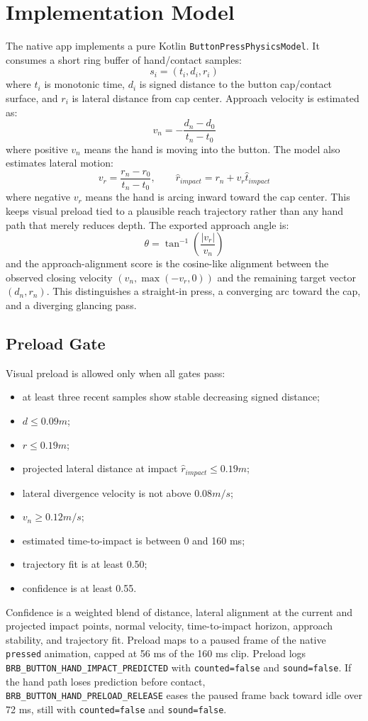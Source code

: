 \documentclass[11pt]{article}
\begin{document}
\section{Implementation Model}
The native app implements a pure Kotlin \texttt{ButtonPressPhysicsModel}. It consumes a short ring buffer of hand/contact samples:
\[
s_i = (t_i, d_i, r_i)
\]
where \(t_i\) is monotonic time, \(d_i\) is signed distance to the button cap/contact surface, and \(r_i\) is lateral distance from cap center. Approach velocity is estimated as:
\[
v_n = -\frac{d_n - d_0}{t_n - t_0}
\]
where positive \(v_n\) means the hand is moving into the button.
The model also estimates lateral motion:
\[
v_r = \frac{r_n - r_0}{t_n - t_0}, \qquad \hat{r}_{impact} = r_n + v_r \hat{t}_{impact}
\]
where negative \(v_r\) means the hand is arcing inward toward the cap center. This keeps visual preload tied to a
plausible reach trajectory rather than any hand path that merely reduces depth.
The exported approach angle is:
\[
\theta = \tan^{-1}\left(\frac{|v_r|}{v_n}\right)
\]
and the approach-alignment score is the cosine-like alignment between the observed closing velocity \((v_n, \max(-v_r,0))\) and the remaining target vector \((d_n,r_n)\). This distinguishes a straight-in press, a converging arc toward the cap, and a diverging glancing pass.

\subsection{Preload Gate}
Visual preload is allowed only when all gates pass:
\begin{itemize}
  \item at least three recent samples show stable decreasing signed distance;
  \item \(d \leq 0.09m\);
  \item \(r \leq 0.19m\);
  \item projected lateral distance at impact \(\hat{r}_{impact} \leq 0.19m\);
  \item lateral divergence velocity is not above \(0.08m/s\);
  \item \(v_n \geq 0.12m/s\);
  \item estimated time-to-impact is between 0 and 160 ms;
  \item trajectory fit is at least 0.50;
  \item confidence is at least 0.55.
\end{itemize}

Confidence is a weighted blend of distance, lateral alignment at the current and projected impact points, normal velocity, time-to-impact horizon, approach stability, and trajectory fit. Preload maps to a paused frame of the native \texttt{pressed} animation, capped at 56 ms of the 160 ms clip. Preload logs \texttt{BRB\_BUTTON\_HAND\_IMPACT\_PREDICTED} with \texttt{counted=false} and \texttt{sound=false}. If the hand path loses prediction before contact, \texttt{BRB\_BUTTON\_HAND\_PRELOAD\_RELEASE} eases the paused frame back toward idle over 72 ms, still with \texttt{counted=false} and \texttt{sound=false}.
\end{document}
